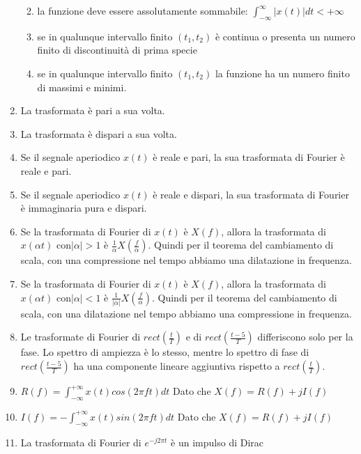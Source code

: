 \documentclass[
  paper=a4,
  ,captions=tableheading
]{scrartcl}
\providecommand{\tightlist}{%
  \setlength{\itemsep}{0pt}\setlength{\parskip}{0pt}}
\begin{document}
\begin{enumerate}
  \begin{enumerate}
  \def\labelenumii{\arabic{enumii}.}
  \tightlist
  \item
    la funzione deve essere assolutamente sommabile:
    \(\displaystyle \int_{-\infty}^{\infty} |x(t)| dt < +\infty\)
  \item
    se in qualunque intervallo finito \((t_1, t_2)\) è continua o
    presenta un numero finito di discontinuità di prima specie
  \item
    se in qualunque intervallo finito \((t_1, t_2)\) la funzione ha un
    numero finito di massimi e minimi.
  \end{enumerate}
\item
  La trasformata è pari a sua volta.
\item
  La trasformata è dispari a sua volta.
\item
  Se il segnale aperiodico \(x(t)\) è reale e pari, la sua trasformata
  di Fourier è reale e pari.
\item
  Se il segnale aperiodico \(x(t)\) è reale e dispari, la sua
  trasformata di Fourier è immaginaria pura e dispari.
\item
  Se la trasformata di Fourier di \(x(t)\) è \(X(f)\), allora la
  trasformata di \(x(\alpha t)\) con\(|\alpha| > 1\) è
  \(\displaystyle \frac{1}{\alpha} X(\frac{f}{\alpha})\). Quindi per il
  teorema del cambiamento di scala, con una compressione nel tempo
  abbiamo una dilatazione in frequenza.
\item
  Se la trasformata di Fourier di \(x(t)\) è \(X(f)\), allora la
  trasformata di \(x(\alpha t)\) con\(|\alpha| < 1\) è
  \(\displaystyle \frac{1}{|\alpha|} X(\frac{f}{\alpha})\). Quindi per
  il teorema del cambiamento di scala, con una dilatazione nel tempo
  abbiamo una compressione in frequenza.
\item
  Le trasformate di Fourier di \(rect (\frac{t}{T})\) e di
  \(rect (\frac{t-5}{T})\) differiscono solo per la fase. Lo spettro di
  ampiezza è lo stesso, mentre lo spettro di fase di
  \(rect (\frac{t-5}{T})\) ha una componente lineare aggiuntiva rispetto
  a \(rect (\frac{t}{T})\).
\item
  \(\displaystyle R(f) = \int_{- \infty}^{+\infty} x(t) cos(2\pi ft)dt\)
  Dato che \(\displaystyle X(f) = R(f)+ jI(f)\)
\item
  \(\displaystyle I(f) =- \int_{- \infty}^{+\infty} x(t) sin(2\pi ft)dt\)
  Dato che \(\displaystyle X(f) = R(f)+ jI(f)\)
\item
  La trasformata di Fourier di \(e^{-j2\pi t}\) è un impulso di Dirac

\end{enumerate}
\end{document}

